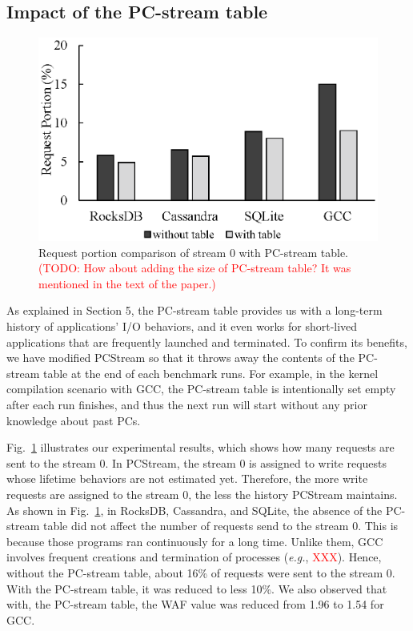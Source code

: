 \subsection{Impact of the PC-stream table}

\begin{figure}[t]
	\centering
	\includegraphics[width=0.7\linewidth]{figure/pctable}
	\caption{Request portion comparison of stream 0 with PC-stream table.
		\textcolor{red}{
			(TODO: How about adding the size of PC-stream table? It was mentioned in
			the text of the paper.)}
		}
	\label{fig:pctable}
\end{figure}

As explained in Section 5, the PC-stream table provides us with a long-term
history of applications' I/O behaviors, and it even works for short-lived
applications that are frequently launched and terminated. To confirm its
benefits, we have modified \textsf{PCStream} so that it throws away the
contents of the PC-stream table at the end of each benchmark runs. For example,
in the kernel compilation scenario with GCC, the PC-stream table is
intentionally set empty after each run finishes, and thus the next run will
start without any prior knowledge about past PCs.

Fig.~\ref{fig:pctable} illustrates our experimental results, which shows how
many requests are sent to the stream 0. In \textsf{PCStream}, the stream 0 is
assigned to write requests whose lifetime behaviors are not estimated yet.
Therefore, the more write requests are assigned to the stream 0, the less the
history \textsf{PCStream} maintains. As shown in Fig.~\ref{fig:pctable}, in
RocksDB, Cassandra, and SQLite, the absence of the PC-stream table did not
affect the number of requests send to the stream 0. This is because those
programs ran continuously for a long time. Unlike them, GCC involves frequent
creations and termination of processes (\textit{e.g.}, \textcolor{red}{XXX}).
Hence, without the PC-stream table, about 16\% of requests were sent to the
stream 0. With the PC-stream table, it was reduced to less 10\%. We also
observed that with, the PC-stream table, the WAF value was reduced from 1.96 to
1.54 for GCC.

